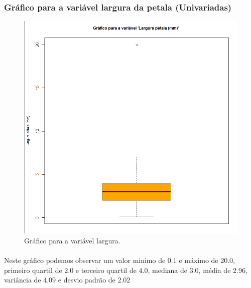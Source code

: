 \documentclass{article}
\begin{document}
\paragraph{}

\paragraph{}



\subsubsection{Gráfico para a variável largura da petala (Univariadas)}
\begin{figure}[h]
       \centering %
        \includegraphics[scale=0.6]{gráfico largura pétala.png} 
       \caption{Gráfico para a variável largura.}
       \label{fig:logo}
    \end{figure}

\paragraph{}Neste gráfico podemos observar um valor minimo de 0.1 e máximo de 20.0, primeiro quartil de 2.0 e terceiro quartil de 4.0, mediana de 3.0, média de 2.96, variância de 4.09 e desvio padrão de 2.02
\end{document}
